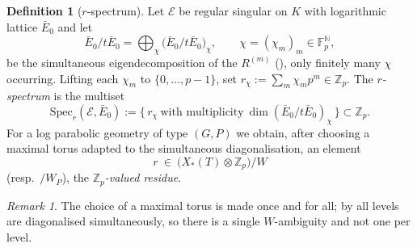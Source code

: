 \documentclass[11pt,reqno]{amsart}
\newcommand{\Zp}{\mathbb{Z}_p}
\newcommand{\Fp}{\mathbb{F}_p}
\newcommand{\NN}{\mathbb{N}}
\newcommand{\cE}{\mathcal{E}}
\newcommand{\Xst}{X_*(T)}
\theoremstyle{plain}
\theoremstyle{definition}
\newtheorem{definition}[theorem]{Definition}
\theoremstyle{remark}
\newtheorem{remark}[theorem]{Remark}
\numberwithin{equation}{section}
\begin{document}
\begin{definition}[$r$-spectrum]\label{def:rspec}
Let $\cE$ be regular singular on $K$ with logarithmic lattice $\bar E_0$
and let
\[
   \bar E_0/t\bar E_0=\bigoplus_{\chi}\bigl(\bar E_0/t\bar E_0\bigr)_\chi,
   \qquad \chi=(\chi_m)_m\in\Fp^{\NN},
\]
be the simultaneous eigendecomposition of the $R^{(m)}$
(), only finitely many $\chi$ occurring.  Lifting each
$\chi_m$ to $\{0,\dots,p-1\}$, set
$r_\chi:=\sum_m\chi_mp^m\in\Zp$.  The \emph{$r$-spectrum} is the
multiset
\[
   \mathrm{Spec}_r(\cE,\bar E_0):=
   \bigl\{\,r_\chi\ \text{with multiplicity}\ \dim(\bar E_0/t\bar E_0)_\chi\,\bigr\}
   \subset\Zp .
\]
For a log parabolic geometry of type $(G,P)$ we obtain, after choosing a
maximal torus adapted to the simultaneous diagonalisation, an element
\[
   r\ \in\ \bigl(\Xst\otimes\Zp\bigr)/W
\]
(resp.\ $/W_P$), the \emph{$\Zp$-valued residue}.
\end{definition}

\begin{remark}
The choice of a maximal torus is made once and for all; by
 all levels are diagonalised simultaneously, so there
is a single $W$-ambiguity and not one per level.
\end{remark}
\end{document}
